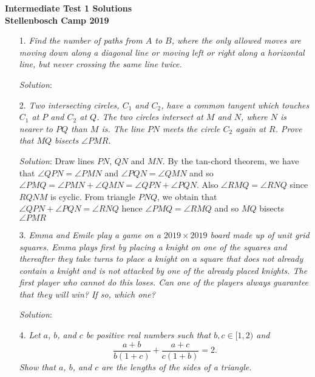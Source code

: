 \documentclass{article}
\begin{document}
\begin{center}
  \textbf{\Large Intermediate Test 1 Solutions}
  \\ \vspace{1em}
  \textbf{\large Stellenbosch Camp 2019}
\end{center}


\begin{enumerate}[1.]

\item[1.] %
\textit{Find the number of paths from $A$ to $B$, where the only allowed moves are moving down along a diagonal line or moving left or right along a horizontal line, but never crossing the same line twice.}

\textit{Solution}:
\vspace{6.81mm}

\item[2.] %
\textit{Two intersecting circles, $C_1$ and $C_2$, have a common tangent which touches $C_1$ at $P$ and $C_2$ at $Q$. The two circles intersect at $M$ and $N$, where $N$ is nearer to $PQ$ than $M$ is. The line $PN$ meets the circle $C_2$ again at $R$. Prove that $MQ$ bisects $\angle PMR$.}

\textit{Solution}: Draw lines $PN$, $QN$ and $MN$. By the tan-chord theorem, we have that $\angle QPN=\angle PMN$ and $\angle PQN=\angle QMN$ and so $\angle PMQ=\angle PMN+\angle QMN=\angle QPN+\angle PQN$. Also $\angle RMQ=\angle RNQ$ since $RQNM$ is cyclic. From triangle $PNQ$, we obtain that $\angle QPN+\angle PQN= \angle RNQ$ hence $\angle PMQ=\angle RMQ$ and so $MQ$ bisects $\angle PMR$ 
\vspace{6.81mm}

\item[3.] %
\textit{Emma and Emile play a game on a $2019 \times 2019$ board made up of unit grid squares. Emma plays first by placing a knight on one of the squares and thereafter they take turns to place a knight on a square that does not already contain a knight and is not attacked by one of the already placed knights. The first player who cannot do this loses. Can one of the players always guarantee that they will win? If so, which one? }

\textit{Solution}:
\vspace{6.81mm}

\item[4.] %
\textit{Let $a$, $b$, and $c$ be positive real numbers such that $b, c \in [1,2)$ and
\[ \frac{a+b}{b(1+c)} +\frac{a+c}{c(1+b)} = 2. \]
Show that $a$, $b$, and $c$ are the lengths of the sides of a triangle.}


\end{enumerate}
\end{document}
